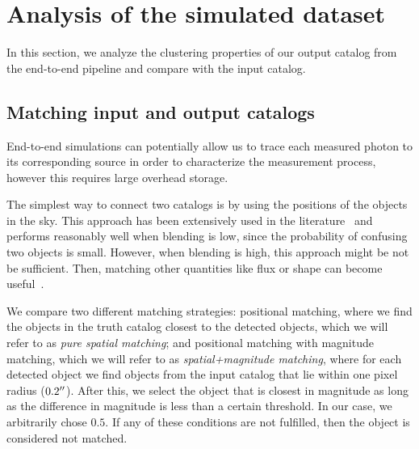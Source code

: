 \documentclass[twocolumn]{aastex62}
\begin{document}
\section{Analysis of the simulated dataset}
\label{sec:analysis}
In this section, we analyze the clustering properties of our output catalog from the end-to-end pipeline and compare with the input catalog.

\subsection{Matching input and output catalogs}
\label{sec:matching}

End-to-end simulations can potentially allow us to trace each measured photon to its corresponding source in order to characterize the measurement process, however this requires large overhead storage. 


The simplest way to connect two catalogs is by using the positions of the objects in the sky. This approach has been extensively used in the literature~\citep{1977A&AS...28..211D,1983Obs...103..150B,1986MNRAS.223..279W} and performs reasonably well when blending is low, since the probability of confusing two objects is small. However, when blending is high, this approach might be not be sufficient. Then, matching other quantities like flux or shape can become useful~\citep{2008ApJ...679..301B}.

We compare two different matching strategies: positional matching, where we find the objects in the truth catalog closest to the detected objects, which we will refer to as \textit{pure spatial matching}; and positional matching with magnitude matching, which we will refer to as \textit{spatial+magnitude matching}, where for each detected object we find objects from the input catalog that lie within one pixel radius ($0.2 \mbox{$^{\prime\prime}$}$). After this, we select the object that is closest in magnitude as long as the difference in magnitude is less than a certain threshold. In our case, we arbitrarily chose $0.5$. If any of these conditions are not fulfilled, then the object is considered not matched.
\end{document}
